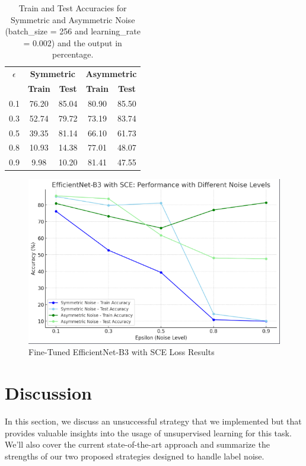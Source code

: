 \documentclass[11pt,twocolumn,letterpaper]{article}
\begin{document}
\begin{table}[h]
\centering
\begin{tabular}{|c|c|c|c|c|}
\hline
\textbf{\(\epsilon\)} & \multicolumn{2}{c|}{\textbf{Symmetric}} & \multicolumn{2}{c|}{\textbf{Asymmetric}} \\
\cline{2-5}
 & \textbf{Train} & \textbf{Test} & \textbf{Train} & \textbf{Test} \\
\hline
0.1 & 76.20 & 85.04 & 80.90 & 85.50 \\
\hline
0.3 & 52.74 & 79.72 & 73.19 & 83.74 \\
\hline
0.5 & 39.35 & 81.14 & 66.10 & 61.73 \\
\hline
0.8 & 10.93 & 14.38 & 77.01 & 48.07 \\
\hline
0.9 & 9.98 & 10.20 & 81.41 & 47.55 \\
\hline
\end{tabular}
\caption{Train and Test Accuracies for Symmetric and Asymmetric Noise (batch\_size = 256 and learning\_rate = 0.002) and the output in percentage.}
\label{tab:mergedAccuracyEfficient}
\end{table}
\begin{figure}[ht]
    \centering
    \includegraphics[width=1\linewidth, trim={0 20pt 20pt 0}, clip]{efficientnetresults.png}
    \caption{Fine-Tuned EfficientNet-B3 with SCE Loss Results}
    \label{fig:EfficientNetResults}
\end{figure}

\section{Discussion}
In this section, we discuss an unsuccessful strategy that we implemented but that provides valuable insights into the usage of unsupervised learning for this task. We'll also cover the current state-of-the-art approach and summarize the strengths of our two proposed strategies designed to handle label noise.
\end{document}
